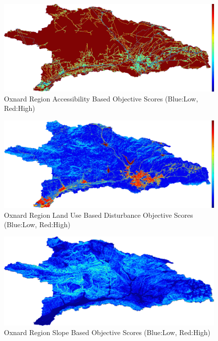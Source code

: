         \begin{figure}[!h]
            \begin{center}
            \includegraphics[width=5.5in]{figures/Oxnard_AccessibilityScore.png}   
            \caption{Oxnard Region Accessibility Based Objective Scores (Blue:Low, Red:High)}
            \label{fig:Oaccessibilty}
            \end{center}
        \end{figure}

        \begin{figure}[!h]
            \begin{center}
            \includegraphics[width=5.5in]{figures/Oxnard_DisturbanceScore.png}   
            \caption{Oxnard Region Land Use Based Disturbance Objective Scores (Blue:Low, Red:High)}
            \label{fig:Odisturbance}
            \end{center}
        \end{figure}
        
        \begin{figure}[!h]
            \begin{center}
            \includegraphics[width=5.5in]{figures/Oxnard_SlopeScore.png}   
            \caption{Oxnard Region Slope Based Objective Scores (Blue:Low, Red:High)}
            \label{fig:Oslope}
            \end{center}
        \end{figure}
        

